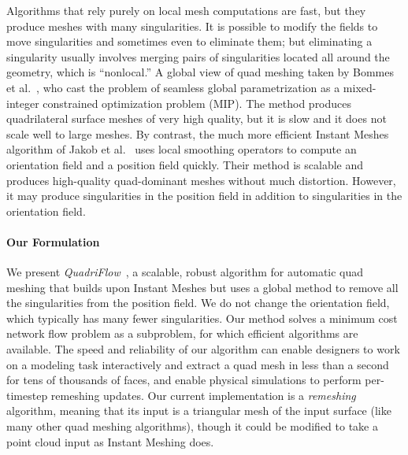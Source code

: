 Algorithms that rely purely on local mesh computations are fast, but they produce meshes with many singularities. It is possible to modify the fields to move singularities and sometimes even to eliminate them; but eliminating a singularity
usually involves merging pairs of singularities located all around the geometry, which is ``nonlocal.'' 
A global view of quad meshing taken by Bommes et al.~\cite{bommes2009mixed}, who cast the problem of seamless global parametrization as a mixed-integer constrained optimization problem (MIP).
The method produces quadrilateral surface meshes of very high quality, but it is slow and it does not scale well to large meshes. By contrast, the much more efficient Instant Meshes algorithm of Jakob et al.~\cite{jakob2015instant} uses local smoothing operators to compute an orientation field and a position field quickly. Their method is scalable and produces high-quality quad-dominant meshes without much distortion. However, it may produce singularities in the position field in addition to singularities in the orientation field.

\paragraph*{Our Formulation} We present \emph{QuadriFlow}~\cite{huang2018quadriflow}, a scalable, robust algorithm for automatic quad meshing that builds upon Instant Meshes but uses a global method to remove all the singularities from the position field.
We do not change the orientation field, which typically has many fewer singularities. Our method solves a minimum cost network flow problem as a subproblem, for which efficient algorithms are available. The speed and reliability of our algorithm can enable designers to work on a modeling task interactively and extract a quad mesh in less than a second for tens of thousands of faces, and enable physical simulations to perform per-timestep remeshing updates. Our current implementation is a \emph{remeshing} algorithm, meaning that its input is a triangular mesh of the input surface (like many other quad meshing algorithms), though it could be modified to take a point cloud input as Instant Meshing does.

